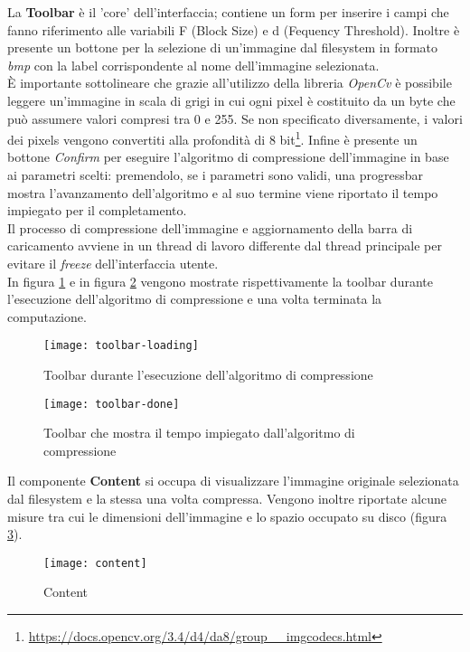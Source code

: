 La \textbf{Toolbar} è il 'core' dell'interfaccia; contiene un form per inserire i campi che fanno riferimento alle variabili F (Block Size) e d (Fequency Threshold). Inoltre è presente un bottone per la selezione di un'immagine dal filesystem in formato \emph{bmp} con la label corrispondente al nome dell'immagine selezionata.\\
È importante sottolineare che grazie all'utilizzo della libreria \emph{OpenCv} è possibile leggere un'immagine in scala di grigi in cui ogni pixel è costituito da un byte che può assumere valori compresi tra 0 e 255. Se non specificato diversamente, i valori dei pixels vengono convertiti alla profondità di 8 bit\footnote{\url{https://docs.opencv.org/3.4/d4/da8/group__imgcodecs.html}}.
Infine è presente un bottone \emph{Confirm} per eseguire l'algoritmo di compressione dell'immagine in base ai parametri scelti: premendolo, se i parametri sono validi, una progressbar mostra l'avanzamento dell'algoritmo e al suo termine viene riportato il tempo impiegato per il completamento.\\
Il processo di compressione dell'immagine e aggiornamento della barra di caricamento avviene in un thread di lavoro differente dal thread principale per evitare il \emph{freeze} dell'interfaccia utente.\\
In figura \ref{fig:toolbarloading} e in figura \ref{fig:toolbardone} vengono mostrate rispettivamente la toolbar durante l'esecuzione dell'algoritmo di compressione e una volta terminata la computazione.

\begin{figure}[H]
    \texttt{[image: toolbar-loading]}\centering
    \caption{Toolbar durante l'esecuzione dell'algoritmo di compressione}\label{fig:toolbar loading}\label{fig:toolbarloading}
\end{figure}
\begin{figure}[H]
    \texttt{[image: toolbar-done]}\centering
    \caption{Toolbar che mostra il tempo impiegato dall'algoritmo di compressione}\label{fig:toolbardone}\label{fig:toolbardone}
\end{figure}

Il componente \textbf{Content} si occupa di visualizzare l'immagine originale selezionata dal filesystem e la stessa una volta compressa.
Vengono inoltre riportate alcune misure tra cui le dimensioni dell'immagine e lo spazio occupato su disco (figura \ref{fig:content}).
\begin{figure}[H]
    \texttt{[image: content]}\centering
    \caption{Content}\label{fig:content}
\end{figure}